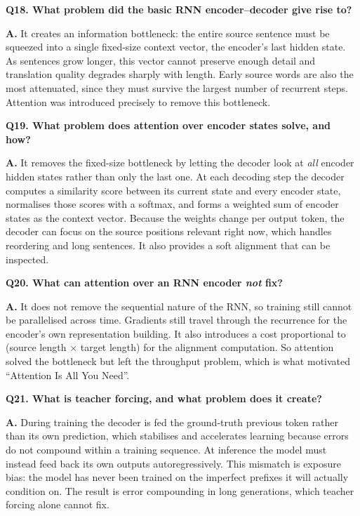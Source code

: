 \documentclass[11pt]{article}
\begin{document}
\medskip
\noindent\textbf{Q18. What problem did the basic RNN encoder--decoder give rise to?}

\noindent\textbf{A.} It creates an information bottleneck: the entire source sentence must be squeezed into a single fixed-size context vector, the encoder's last hidden state. As sentences grow longer, this vector cannot preserve enough detail and translation quality degrades sharply with length. Early source words are also the most attenuated, since they must survive the largest number of recurrent steps. Attention was introduced precisely to remove this bottleneck.

\medskip
\noindent\textbf{Q19. What problem does attention over encoder states solve, and how?}

\noindent\textbf{A.} It removes the fixed-size bottleneck by letting the decoder look at \emph{all} encoder hidden states rather than only the last one. At each decoding step the decoder computes a similarity score between its current state and every encoder state, normalises those scores with a softmax, and forms a weighted sum of encoder states as the context vector. Because the weights change per output token, the decoder can focus on the source positions relevant right now, which handles reordering and long sentences. It also provides a soft alignment that can be inspected.

\medskip
\noindent\textbf{Q20. What can attention over an RNN encoder \emph{not} fix?}

\noindent\textbf{A.} It does not remove the sequential nature of the RNN, so training still cannot be parallelised across time. Gradients still travel through the recurrence for the encoder's own representation building. It also introduces a cost proportional to (source length $\times$ target length) for the alignment computation. So attention solved the bottleneck but left the throughput problem, which is what motivated ``Attention Is All You Need''.

\medskip
\noindent\textbf{Q21. What is teacher forcing, and what problem does it create?}

\noindent\textbf{A.} During training the decoder is fed the ground-truth previous token rather than its own prediction, which stabilises and accelerates learning because errors do not compound within a training sequence. At inference the model must instead feed back its own outputs autoregressively. This mismatch is exposure bias: the model has never been trained on the imperfect prefixes it will actually condition on. The result is error compounding in long generations, which teacher forcing alone cannot fix.
\end{document}
